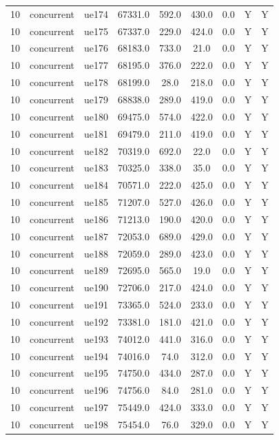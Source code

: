 \begin{table}[ht]
\begin{tabular}{|c|c|c|c|c|c|c|c|c|}
10 & concurrent & ue174 & 67331.0 & 592.0 & 430.0 & 0.0 & Y & Y \\
10 & concurrent & ue175 & 67337.0 & 229.0 & 424.0 & 0.0 & Y & Y \\
10 & concurrent & ue176 & 68183.0 & 733.0 & 21.0 & 0.0 & Y & Y \\
10 & concurrent & ue177 & 68195.0 & 376.0 & 222.0 & 0.0 & Y & Y \\
10 & concurrent & ue178 & 68199.0 & 28.0 & 218.0 & 0.0 & Y & Y \\
10 & concurrent & ue179 & 68838.0 & 289.0 & 419.0 & 0.0 & Y & Y \\
10 & concurrent & ue180 & 69475.0 & 574.0 & 422.0 & 0.0 & Y & Y \\
10 & concurrent & ue181 & 69479.0 & 211.0 & 419.0 & 0.0 & Y & Y \\
10 & concurrent & ue182 & 70319.0 & 692.0 & 22.0 & 0.0 & Y & Y \\
10 & concurrent & ue183 & 70325.0 & 338.0 & 35.0 & 0.0 & Y & Y \\
10 & concurrent & ue184 & 70571.0 & 222.0 & 425.0 & 0.0 & Y & Y \\
10 & concurrent & ue185 & 71207.0 & 527.0 & 426.0 & 0.0 & Y & Y \\
10 & concurrent & ue186 & 71213.0 & 190.0 & 420.0 & 0.0 & Y & Y \\
10 & concurrent & ue187 & 72053.0 & 689.0 & 429.0 & 0.0 & Y & Y \\
10 & concurrent & ue188 & 72059.0 & 289.0 & 423.0 & 0.0 & Y & Y \\
10 & concurrent & ue189 & 72695.0 & 565.0 & 19.0 & 0.0 & Y & Y \\
10 & concurrent & ue190 & 72706.0 & 217.0 & 424.0 & 0.0 & Y & Y \\
10 & concurrent & ue191 & 73365.0 & 524.0 & 233.0 & 0.0 & Y & Y \\
10 & concurrent & ue192 & 73381.0 & 181.0 & 421.0 & 0.0 & Y & Y \\
10 & concurrent & ue193 & 74012.0 & 441.0 & 316.0 & 0.0 & Y & Y \\
10 & concurrent & ue194 & 74016.0 & 74.0 & 312.0 & 0.0 & Y & Y \\
10 & concurrent & ue195 & 74750.0 & 434.0 & 287.0 & 0.0 & Y & Y \\
10 & concurrent & ue196 & 74756.0 & 84.0 & 281.0 & 0.0 & Y & Y \\
10 & concurrent & ue197 & 75449.0 & 424.0 & 333.0 & 0.0 & Y & Y \\
10 & concurrent & ue198 & 75454.0 & 76.0 & 329.0 & 0.0 & Y & Y \\

\end{tabular}
\end{table}
